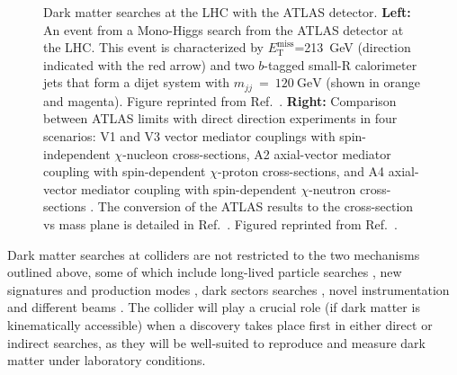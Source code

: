 \begin{figure}[!ht]
\begin{subfigure}{0.56\textwidth}
         \caption[Comparison between ATLAS limits with direct direction experiments in four scenarios]{}
         \label{fig:DMOverview/ATLASDMSearch}
     \end{subfigure}
     \caption[Dark matter searches at the LHC with the ATLAS detector.]{Dark matter searches at the LHC with the ATLAS detector. \textbf{Left:} An event from a Mono-Higgs search from the ATLAS detector at the LHC. This event is characterized by $E^{\text{miss}}_\text{T}$=213~GeV (direction indicated with the red arrow) and two $b$-tagged small-R calorimeter jets that form a dijet system with $m_{jj}~=~120~\text{GeV}$ (shown in orange and magenta). Figure reprinted from Ref.~\cite{ATLAS:2016btj}. \textbf{Right:} Comparison between ATLAS limits with direct direction experiments in four scenarios: V1 and V3 vector mediator couplings with spin-independent $\chi$-nucleon cross-sections, A2 axial-vector mediator coupling with spin-dependent $\chi$-proton cross-sections, and A4 axial-vector mediator coupling with spin-dependent $\chi$-neutron cross-sections \cite{ATLAS:2024kpy}. The conversion of the ATLAS results to the cross-section vs mass plane is detailed in Ref.~\cite{Boveia:2016mrp}. Figured reprinted from Ref.~\cite{ATLAS:2024kpy}.}
     \label{fig:DMOverview/ColliderTwoPanel}
\end{figure}

Dark matter searches at colliders are not restricted to the two mechanisms outlined above, some of which include long-lived particle searches \cite{Mitsou:2021tti}, new signatures and production modes \cite{Dienes:2021cxr,tcarter:thesis}, dark sectors searches \cite{Cohen:2017pzm,ajaspan:thesis}, novel instrumentation and different beams \cite{Feng:2017uoz,Batell:2014mga}. The collider will play a crucial role (if dark matter is kinematically accessible) when a discovery takes place first in either direct or indirect searches, as they will be well-suited to reproduce and measure dark matter under laboratory conditions.

